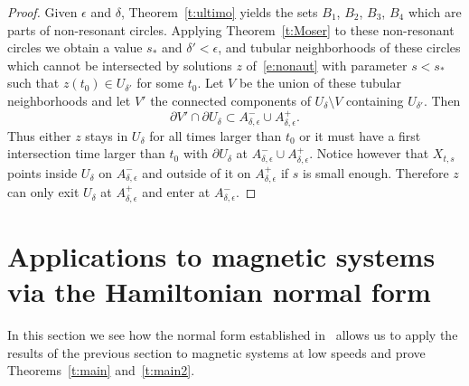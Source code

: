 \documentclass[AHL,Unicode,longabstracts,published]{cedram}
\newcommand{\p}{\partial}
\begin{document}
\begin{proof}
Given $\epsilon$ and $\delta$, Theorem~\ref{t:ultimo} yields the sets $B_1$, $B_2$, $B_3$, $B_4$ which are parts of non-resonant circles. Applying Theorem~\ref{t:Moser} to these non-resonant circles we obtain a value $s_*$ and $\delta'<\epsilon$, and tubular neighborhoods of these circles which cannot be intersected by solutions $z$ of~\eqref{e:nonaut} with parameter $s<s_*$ such that $z(t_0)\in U_{\delta'}$ for some $t_0$. Let $V$ be the union of these tubular neighborhoods and let $V'$ the connected components of $U_\delta\setminus V$ containing $U_{\delta'}$. Then
\[
\p V'\cap \p U_\delta\subset A^-_{\delta,\epsilon}\cup A^+_{\delta,\epsilon}.
\]
Thus either $z$ stays in $U_\delta$ for all times larger than $t_0$ or it must have a first intersection time larger than $t_0$ with $\p U_\delta$ at $A^-_{\delta,\epsilon}\cup A^+_{\delta,\epsilon}$. Notice however that $X_{t,s}$ points inside $U_\delta$ on $A^-_{\delta,\epsilon}$ and outside of it on $A^+_{\delta,\epsilon}$ if $s$ is small enough. Therefore $z$ can only exit $U_\delta$ at $A^+_{\delta,\epsilon}$ and enter at $A^-_{\delta,\epsilon}$.
\end{proof}



\section{Applications to magnetic systems via the Hamiltonian normal form}\label{s:app}
In this section we see how the normal form established in~\cite{AB21,Castilho:2001} allows us to apply the results of the previous section to magnetic systems at low speeds and prove Theorems~\ref{t:main} and~\ref{t:main2}.
\end{document}
